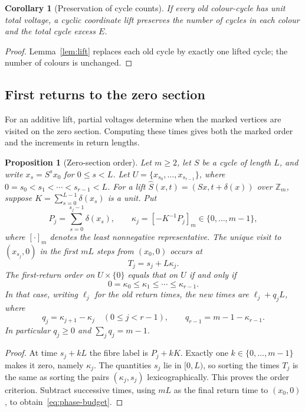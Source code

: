 \documentclass[11pt,reqno]{amsart}
\numberwithin{equation}{section}
\newtheorem{proposition}[theorem]{Proposition}
\newtheorem{corollary}[theorem]{Corollary}
\theoremstyle{definition}
\theoremstyle{remark}
\newcommand{\Zm}{\mathbb Z_m}
\begin{document}
\begin{corollary}[Preservation of cycle counts]\label{cor:inventory}
If every old colour-cycle has unit total voltage, a cyclic coordinate
lift preserves the number of cycles in each colour and the total cycle
excess $E$.
\end{corollary}
\begin{proof}
Lemma~\ref{lem:lift} replaces each old cycle by exactly one lifted cycle;
the number of colours is unchanged.
\end{proof}


\subsection{First returns to the zero section}
For an additive lift, partial voltages determine when the marked
vertices are visited on the zero section. Computing these times gives
both the marked order and the increments in return lengths.

\begin{proposition}[Zero-section order]\label{prop:phase-order}
Let $m\ge2$, let $S$ be a cycle of length $L$, and write $x_s=S^s x_0$ for $0\le s<L$. Let $U=\{x_{s_0},\ldots,x_{s_{r-1}}\}$, where
$0=s_0<s_1<\cdots<s_{r-1}<L$. For a lift
$\widehat S(x,t)=(Sx,t+\delta(x))$ over $\Zm$, suppose
$K=\sum_{s=0}^{L-1}\delta(x_s)$ is a unit. Put
\[
 P_j=\sum_{s=0}^{s_j-1}\delta(x_s),\qquad
 \kappa_j=[-K^{-1}P_j]_m\in\{0,\ldots,m-1\},
\]
where $[\cdot]_m$ denotes the least nonnegative representative.
The unique visit to $(x_{s_j},0)$ in the first $mL$ steps from $(x_0,0)$
occurs at
\begin{equation}\label{eq:zero-visit-time}
 T_j=s_j+L\kappa_j.
\end{equation}
The first-return order on $U\times\{0\}$ equals that on $U$ if and only if
\begin{equation}\label{eq:phase-order}
 0=\kappa_0\le\kappa_1\le\cdots\le\kappa_{r-1}.
\end{equation}
In that case, writing $\ell_j$ for the old return times, the new times are
$\ell_j+q_jL$, where
\begin{equation}\label{eq:phase-budget}
 q_j=\kappa_{j+1}-\kappa_j\quad(0\le j<r-1),\qquad
 q_{r-1}=m-1-\kappa_{r-1}.
\end{equation}
In particular $q_j\ge0$ and $\sum_jq_j=m-1$.
\end{proposition}
\begin{proof}
At time $s_j+kL$ the fibre label is $P_j+kK$. Exactly one
$k\in\{0,\ldots,m-1\}$ makes it zero, namely $\kappa_j$.
The quantities $s_j$ lie in $[0,L)$, so sorting the times $T_j$ is the
same as sorting the pairs $(\kappa_j,s_j)$ lexicographically. This proves
the order criterion. Subtract successive times, using $mL$ as the final
return time to $(x_0,0)$, to obtain~\eqref{eq:phase-budget}.
\end{proof}
\end{document}

